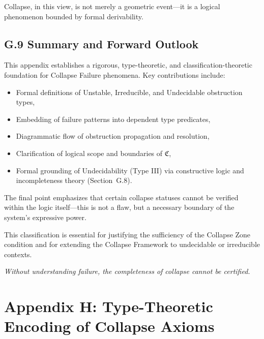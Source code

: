 \documentclass[11pt]{article}
\begin{document}
Collapse, in this view, is not merely a geometric event—it is a logical phenomenon bounded by formal derivability.

\subsection*{G.9 Summary and Forward Outlook}
\label{sec:collapse-failure-summary}

This appendix establishes a rigorous, type-theoretic, and classification-theoretic foundation for Collapse Failure phenomena. Key contributions include:

\begin{itemize}
  \item Formal definitions of Unstable, Irreducible, and Undecidable obstruction types,
  \item Embedding of failure patterns into dependent type predicates,
  \item Diagrammatic flow of obstruction propagation and resolution,
  \item Clarification of logical scope and boundaries of \( \mathfrak{C} \),
  \item Formal grounding of Undecidability (Type III) via constructive logic and incompleteness theory (Section~G.8).
\end{itemize}

The final point emphasizes that certain collapse statuses cannot be verified within the logic itself—this is not a flaw, but a necessary boundary of the system's expressive power.

This classification is essential for justifying the sufficiency of the Collapse Zone condition and for extending the Collapse Framework to undecidable or irreducible contexts.

\begin{center}
\textit{Without understanding failure, the completeness of collapse cannot be certified.}
\end{center}




\appendix
\section*{Appendix H: \texorpdfstring{Type-Theoretic Encoding of Collapse Axioms}{Type-Theoretic Encoding of Collapse Axioms}}
\end{document}
